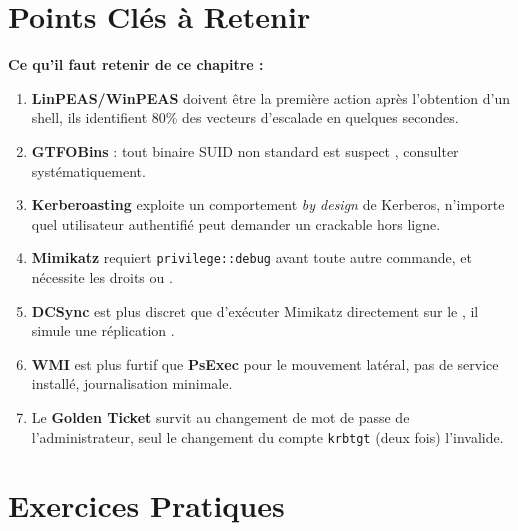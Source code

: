 \section*{Points Clés à Retenir}

\begin{boxinfo}
\textbf{Ce qu'il faut retenir de ce chapitre :}
\begin{enumerate}
    \item \textbf{LinPEAS/WinPEAS} doivent être la première action après
          l'obtention d'un shell, ils identifient 80\% des vecteurs
          d'escalade en quelques secondes.
    \item \textbf{GTFOBins} : tout binaire SUID non standard est suspect
         , consulter systématiquement.
    \item \textbf{Kerberoasting} exploite un comportement \textit{by design}
          de Kerberos, n'importe quel utilisateur authentifié peut demander
          un  crackable hors ligne.
    \item \textbf{Mimikatz} requiert \texttt{privilege::debug} avant toute
          autre commande, et nécessite les droits  ou
          .
    \item \textbf{DCSync} est plus discret que d'exécuter Mimikatz
          directement sur le , il simule une réplication .
    \item \textbf{WMI} est plus furtif que \textbf{PsExec} pour le
          mouvement latéral, pas de service installé, journalisation minimale.
    \item Le \textbf{Golden Ticket} survit au changement de mot de passe
          de l'administrateur, seul le changement du compte
          \texttt{krbtgt} (deux fois) l'invalide.
\end{enumerate}
\end{boxinfo}

\section*{Exercices Pratiques}

